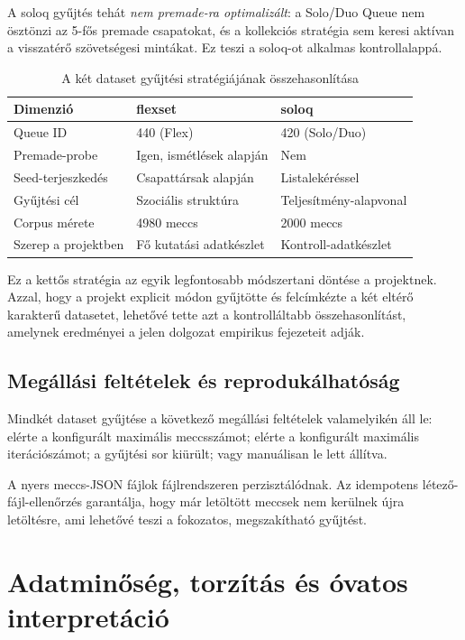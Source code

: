 ﻿\documentclass[a4paper,12pt]{report}
\begin{document}
A soloq gyűjtés tehát \emph{nem premade-ra optimalizált}: a Solo/Duo Queue nem ösztönzi az 5-fős premade csapatokat, és a kollekciós stratégia sem keresi aktívan a visszatérő szövetségesi mintákat. Ez teszi a soloq-ot alkalmas kontrollalappá.

\begin{table}[H]
\centering
\caption{A két dataset gyűjtési stratégiájának összehasonlítása}
\begin{tabularx}{\textwidth}{>{\raggedright\arraybackslash}p{4.2cm} X X}
\toprule
\textbf{Dimenzió} & \textbf{flexset} & \textbf{soloq} \\
\midrule
Queue ID & 440 (Flex) & 420 (Solo/Duo) \\
Premade-probe & Igen, ismétlések alapján & Nem \\
Seed-terjeszkedés & Csapattársak alapján & Listalekéréssel \\
Gyűjtési cél & Szociális struktúra & Teljesítmény-alapvonal \\
Corpus mérete & 4980 meccs & 2000 meccs \\
Szerep a projektben & Fő kutatási adatkészlet & Kontroll-adatkészlet \\
\bottomrule
\end{tabularx}
\end{table}

Ez a kettős stratégia az egyik legfontosabb módszertani döntése a projektnek. Azzal, hogy a projekt explicit módon gyűjtötte és felcímkézte a két eltérő karakterű datasetet, lehetővé tette azt a kontrolláltabb összehasonlítást, amelynek eredményei a jelen dolgozat empirikus fejezeteit adják.

\subsection{Megállási feltételek és reprodukálhatóság}

Mindkét dataset gyűjtése a következő megállási feltételek valamelyikén áll le: elérte a konfigurált maximális meccsszámot; elérte a konfigurált maximális iterációszámot; a gyűjtési sor kiürült; vagy manuálisan le lett állítva.

A nyers meccs-JSON fájlok fájlrendszeren perzisztálódnak. Az idempotens létező-fájl-ellenőrzés garantálja, hogy már letöltött meccsek nem kerülnek újra letöltésre, ami lehetővé teszi a fokozatos, megszakítható gyűjtést.

\section{Adatminőség, torzítás és óvatos interpretáció}
\end{document}
